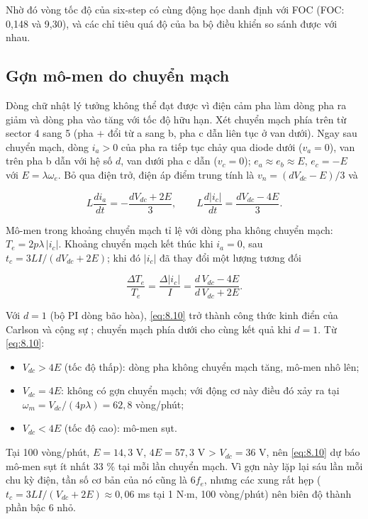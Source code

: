 Nhờ đó vòng tốc độ của six-step có cùng động học danh định với FOC (FOC: 0,148 và 9,30), và các chỉ tiêu quá độ của ba bộ điều khiển so sánh được với nhau.

\subsection{Gợn mô-men do chuyển mạch}\label{sec:8.3}

Dòng chữ nhật lý tưởng không thể đạt được vì điện cảm pha làm dòng pha ra giảm và dòng pha vào tăng với tốc độ hữu hạn. Xét chuyển mạch phía trên từ sector 4 sang 5 (pha $+$ đổi từ a sang b, pha c dẫn liên tục ở van dưới). Ngay sau chuyển mạch, dòng $i_a > 0$ của pha ra tiếp tục chảy qua diode dưới ($v_a = 0$), van trên pha b dẫn với hệ số $d$, van dưới pha c dẫn ($v_c = 0$); $e_a \approx e_b \approx E$, $e_c = -E$ với $E = \lambda\omega_e$. Bỏ qua điện trở, điện áp điểm trung tính là $v_n = (dV_{dc} - E)/3$ và

\begin{equation}
L\frac{di_a}{dt} = -\frac{dV_{dc} + 2E}{3}, \qquad L\frac{d|i_c|}{dt} = \frac{dV_{dc} - 4E}{3}.
\tag{8.9}\label{eq:8.9}
\end{equation}

Mô-men trong khoảng chuyển mạch tỉ lệ với dòng pha không chuyển mạch: $T_e = 2p\lambda\,|i_c|$. Khoảng chuyển mạch kết thúc khi $i_a = 0$, sau $t_c = 3LI/(dV_{dc} + 2E)$; khi đó $|i_c|$ đã thay đổi một lượng tương đối

\begin{equation}
\frac{\Delta T_e}{T_e} = \frac{\Delta |i_c|}{I} = \frac{d\,V_{dc} - 4E}{d\,V_{dc} + 2E}.
\tag{8.10}\label{eq:8.10}
\end{equation}

Với $d = 1$ (bộ PI dòng bão hòa), \eqref{eq:8.10} trở thành công thức kinh điển của Carlson và cộng sự \cite{r1}; chuyển mạch phía dưới cho cùng kết quả khi $d = 1$. Từ \eqref{eq:8.10}:

\begin{itemize}[leftmargin=*]
\item $V_{dc} > 4E$ (tốc độ thấp): dòng pha không chuyển mạch tăng, mô-men nhô lên;
\item $V_{dc} = 4E$: không có gợn chuyển mạch; với động cơ này điều đó xảy ra tại $\omega_m = V_{dc}/(4p\lambda) = 62{,}8$ vòng/phút;
\item $V_{dc} < 4E$ (tốc độ cao): mô-men sụt.
\end{itemize}

Tại 100 vòng/phút, $E = 14{,}3$ V, $4E = 57{,}3$ V > $V_{dc} = 36$ V, nên \eqref{eq:8.10} dự báo mô-men sụt ít nhất 33 \% tại mỗi lần chuyển mạch. Vì gợn này lặp lại sáu lần mỗi chu kỳ điện, tần số cơ bản của nó cũng là $6 f_e$, nhưng các xung rất hẹp ($t_c = 3LI/(V_{dc}+2E) \approx 0{,}06$ ms tại 1 N$\cdot$m, 100 vòng/phút) nên biên độ thành phần bậc 6 nhỏ.

